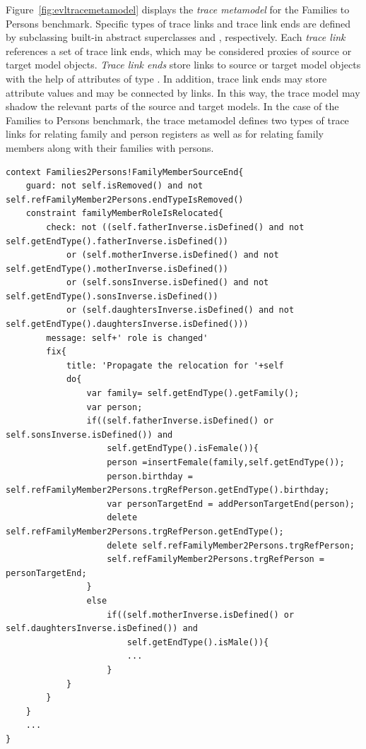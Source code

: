 Figure~\ref{fig:evltracemetamodel} displays the \emph{trace metamodel} for the Families to Persons benchmark. Specific types of trace links and trace link ends are defined by subclassing built-in abstract superclasses  and , respectively. Each \emph{trace link} references a set of trace link ends, which may be considered proxies of source or target model objects. \emph{Trace link ends} store links to source or target model objects with the help of attributes of type . In addition, trace link ends may store attribute values and may be connected by links. In this way, the trace model may shadow the relevant parts of the source and target models. In the case of the Families to Persons benchmark, the trace metamodel defines two types of trace links for relating family and person registers as well as for relating family members along with their families with persons.


 


\begin{lstlisting}[label={lst:evl}, float=*t, language=evl, caption={Example of an EVL constraint}]
context Families2Persons!FamilyMemberSourceEnd{
    guard: not self.isRemoved() and not self.refFamilyMember2Persons.endTypeIsRemoved()	
    constraint familyMemberRoleIsRelocated{
        check: not ((self.fatherInverse.isDefined() and not self.getEndType().fatherInverse.isDefined())
            or (self.motherInverse.isDefined() and not self.getEndType().motherInverse.isDefined())
            or (self.sonsInverse.isDefined() and not self.getEndType().sonsInverse.isDefined())
            or (self.daughtersInverse.isDefined() and not self.getEndType().daughtersInverse.isDefined()))		
        message: self+' role is changed'
        fix{
            title: 'Propagate the relocation for '+self
            do{
                var family= self.getEndType().getFamily();
                var person;
                if((self.fatherInverse.isDefined() or self.sonsInverse.isDefined()) and
                    self.getEndType().isFemale()){
                    person =insertFemale(family,self.getEndType());
                    person.birthday = self.refFamilyMember2Persons.trgRefPerson.getEndType().birthday;
                    var personTargetEnd = addPersonTargetEnd(person);
                    delete self.refFamilyMember2Persons.trgRefPerson.getEndType();
                    delete self.refFamilyMember2Persons.trgRefPerson;
                    self.refFamilyMember2Persons.trgRefPerson = personTargetEnd;
                }
                else 
                    if((self.motherInverse.isDefined() or self.daughtersInverse.isDefined()) and
                        self.getEndType().isMale()){
                        ...
                    }
            }
        }
    }
    ...
}
\end{lstlisting}

